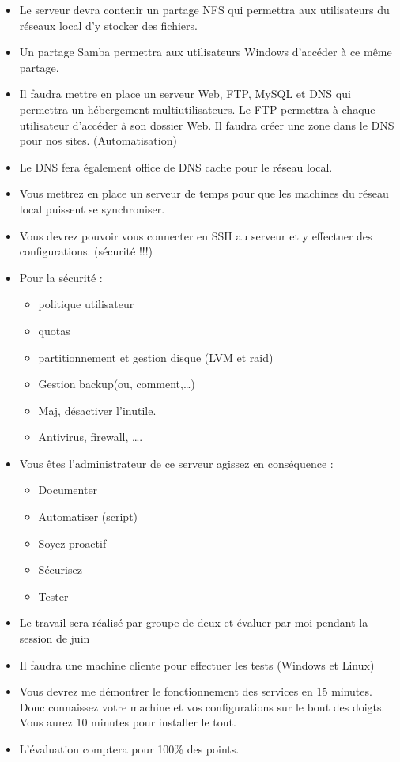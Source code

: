 \documentclass{article}
\begin{document}
	\begin{itemize}
		\item Le serveur devra contenir un partage NFS qui permettra aux utilisateurs du réseaux local d’y stocker des fichiers.
		\item Un partage Samba permettra aux utilisateurs Windows d’accéder à ce même partage.
		\item Il faudra mettre en place un serveur Web, FTP, MySQL et DNS qui permettra un hébergement multiutilisateurs. Le FTP permettra à chaque utilisateur d’accéder à son dossier Web. Il faudra créer une zone dans le DNS pour nos sites. (Automatisation)
		\item Le DNS fera également office de DNS cache pour le réseau local.
		\item Vous mettrez en place un serveur de temps pour que les machines du réseau local puissent se synchroniser.
		\item Vous devrez pouvoir vous connecter en SSH au serveur et y effectuer des configurations. (sécurité !!!)
		\item Pour la sécurité :
		\begin{itemize}
			\item politique utilisateur
			\item quotas
			\item partitionnement et gestion disque (LVM et raid)
			\item Gestion backup(ou, comment,…)
			\item Maj, désactiver l’inutile.
			\item Antivirus, firewall, ….
		\end{itemize}
		\item Vous êtes l’administrateur de ce serveur agissez en conséquence :
		\begin{itemize}
			\item Documenter
			\item Automatiser (script)
			\item Soyez proactif
			\item Sécurisez
			\item Tester
		\end{itemize}
		\item Le travail sera réalisé par groupe de deux et évaluer par moi pendant la session de juin
		\item Il faudra une machine cliente pour effectuer les tests (Windows et Linux)
		\item Vous devrez me démontrer le fonctionnement des services en 15 minutes. Donc connaissez votre machine et vos configurations sur le bout des doigts. Vous aurez 10 minutes pour installer le tout.
		\item L’évaluation comptera pour 100\% des points. 
		
	\end{itemize}
	
\end{document}
